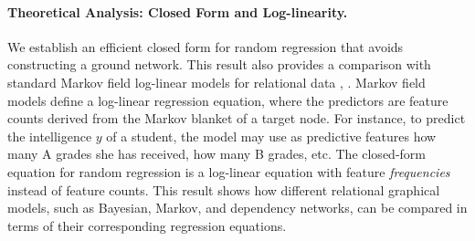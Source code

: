 \documentclass[twoside,leqno,twocolumn]{article}
\begin{document}
\paragraph{Theoretical Analysis: Closed Form and Log-linearity.}
We establish an efficient closed form for random regression that avoids constructing a ground network.
This result also provides a comparison with standard Markov field log-linear models for relational data  \cite{Taskar2002}, \cite{Domingos2007}. 
%
%
%
%
Markov field models 
define a log-linear regression equation, 
where the predictors %
are feature counts derived from the Markov blanket of a target node.  For instance, to predict the intelligence $y$ of a student, the model may use as predictive features how many A grades she has received, how many B grades, etc. The closed-form equation for random regression is a log-linear equation
with feature {\em frequencies} instead of feature counts. This result shows how different relational graphical models, such as Bayesian, Markov, and dependency networks, can be compared in terms of their corresponding regression equations.
\end{document}
